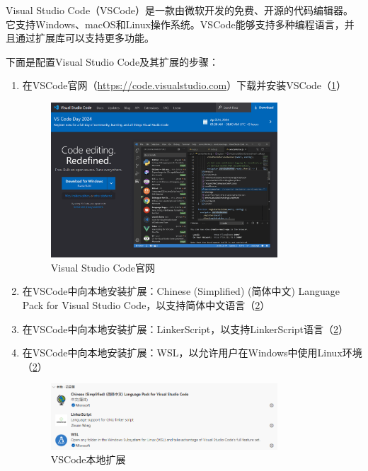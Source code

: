 Visual Studio Code（VSCode）是一款由微软开发的免费、开源的代码编辑器。它支持Windows、macOS和Linux操作系统。VSCode能够支持多种编程语言，并且通过扩展库可以支持更多功能。

下面是配置Visual Studio Code及其扩展的步骤：

\begin{enumerate}
    \item 在VSCode官网（\url{https://code.visualstudio.com}）下载并安装VSCode（\cref{fig:VSCodeWebsite}）
          \begin{figure}[htbp]
              \centering
              \includegraphics[width=0.8\textwidth]{figures/VSCodeWebsite.png}
              \caption{Visual Studio Code官网}
              \label{fig:VSCodeWebsite}
          \end{figure}
    \item 在VSCode中向本地安装扩展：Chinese (Simplified) (简体中文) Language Pack for Visual Studio Code，以支持简体中文语言（\cref{fig:VSCodeLocalExtensions}）
    \item 在VSCode中向本地安装扩展：LinkerScript，以支持LinkerScript语言（\cref{fig:VSCodeLocalExtensions}）
    \item 在VSCode中向本地安装扩展：WSL，以允许用户在Windows中使用Linux环境（\cref{fig:VSCodeLocalExtensions}）
          \begin{figure}[htbp]
              \centering
              \includegraphics[width=0.8\textwidth]{figures/VSCodeLocalExtensions.png}
              \caption{VSCode本地扩展}
              \label{fig:VSCodeLocalExtensions}
          \end{figure}
\end{enumerate}

